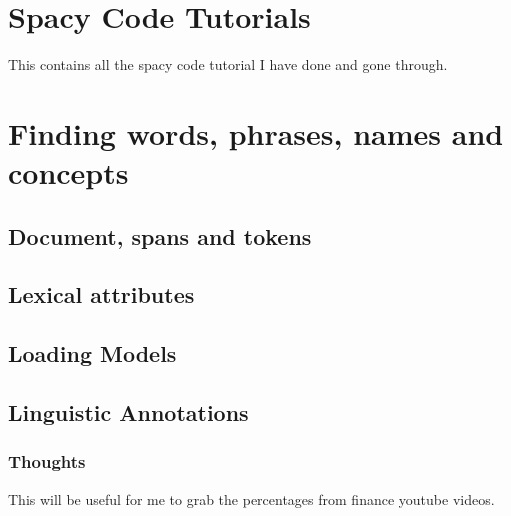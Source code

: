 \section{Spacy Code Tutorials}

This contains all the spacy code tutorial I have done and gone through.



\section*{Finding words, phrases, names and concepts}
\subsection{Document, spans and tokens}





\subsection{Lexical attributes}



\subsection{Loading Models}




\subsection{Linguistic Annotations}

\subsubsection{Thoughts}
This will be useful for me to grab the percentages from finance youtube videos.



